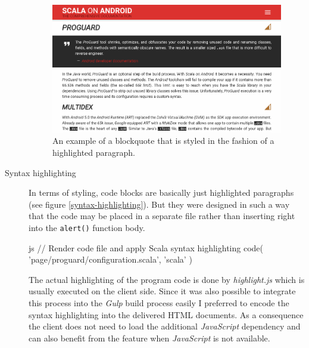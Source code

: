 \begin{description}
	\begin{figure}[H]
		\includegraphics[width=\textwidth]{asset/blockquote.png}
		\caption{An example of a blockquote that is styled in the fashion of a highlighted paragraph.}
		\label{blockquote}
	\end{figure}

	\item[Syntax highlighting]\hfill

	In terms of styling, code blocks are basically just highlighted paragraphs (see figure \ref{syntax-highlighting}). But they were designed in such a way that the code may be placed in a separate file rather than inserting right into the \texttt{alert()} function body.

	\begin{code}{js}
// Render code file and apply Scala syntax highlighting
code( 'page/proguard/configuration.scala', 'scala' )
	\end{code}

	The actual highlighting of the program code is done by \textit{highlight.js} which is usually executed on the client side. Since it was also possible to integrate this process into the \textit{Gulp} build process easily I preferred to encode the syntax highlighting into the delivered \ac{HTML} documents. As a consequence the client does not need to load the additional \textit{JavaScript} dependency and can also benefit from the feature when \textit{JavaScript} is not available.


\end{description}

